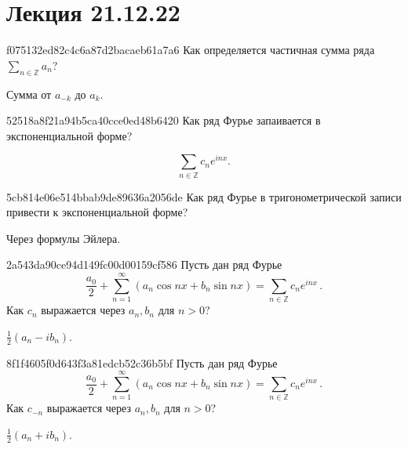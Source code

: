 \section{Лекция 21.12.22}
\begin{note}{f075132ed82c4c6a87d2bacaeb61a7a6}
    Как определяется частичная сумма ряда \({ \sum_{n \in \mathbb Z} a_n }\)?

    \begin{cloze}{1}
        Сумма от \({ a_{-k} }\) до \({ a_k }\).
    \end{cloze}
\end{note}

\begin{note}{52518a8f21a94b5ca40cce0ed48b6420}
    Как ряд Фурье запаивается в экспоненциальной форме?

    \begin{cloze}{1}
        \[
            \sum_{n \in \mathbb Z} c_n e^{i nx}.
        \]
    \end{cloze}
\end{note}

\begin{note}{5cb814e06e514bbab9de89636a2056de}
    Как ряд Фурье в тригонометрической записи привести к экспоненциальной форме?

    \begin{cloze}{1}
        Через формулы Эйлера.
    \end{cloze}
\end{note}

\begin{note}{2a543da90ce94d149fc00d00159cf586}
    Пусть дан ряд Фурье
    \[
        \frac{a_0}{2} + \sum_{n=1}^{\infty} (a_n \cos nx + b_n \sin nx) = \sum_{n \in \mathbb Z} c_n e^{i nx}\,.
    \]
    Как \({ c_n }\) выражается через \({ a_n, b_n }\) для \({ n > 0 }\)?

    \begin{cloze}{1}
        \({ \frac{1}{2}(a_n - ib_n) }\).
    \end{cloze}
\end{note}

\begin{note}{8f1f4605f0d643f3a81edcb52c36b5bf}
    Пусть дан ряд Фурье
    \[
        \frac{a_0}{2} + \sum_{n=1}^{\infty} (a_n \cos nx + b_n \sin nx) = \sum_{n \in \mathbb Z} c_n e^{i nx}\,.
    \]
    Как \({ c_{-n} }\) выражается через \({ a_n, b_n }\) для \({ n > 0 }\)?

    \begin{cloze}{1}
        \({ \frac{1}{2}(a_n + ib_n) }\).
    \end{cloze}
\end{note}

